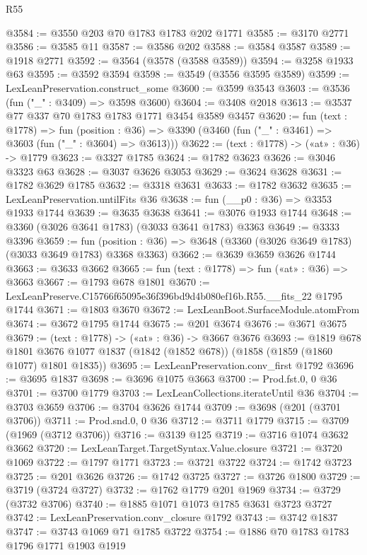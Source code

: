 \begin{lexlean}{R55}
\begin{coremodule}
@3584 := @3550 @203 @70 @1783 @1783 @202 @1771
@3585 := @3170 @2771
@3586 := @3585 @11
@3587 := @3586 @202
@3588 := @3584 @3587
@3589 := @1918 @2771
@3592 := @3564 (@3578 (@3588 @3589))
@3594 := @3258 @1933 @63
@3595 := @3592 @3594
@3598 := @3549 (@3556 @3595 @3589)
@3599 := LexLeanPreservation.construct_some
@3600 := @3599 @3543
@3603 := @3536 (fun ("_" : @3409) => @3598 @3600)
@3604 := @3408 @2018
@3613 := @3537 @77 @337 @70 @1783 @1783 @1771 @3454 @3589 @3457
@3620 := fun (text : @1778) =>
  fun (position : @36) => @3390 (@3460 (fun ("_" : @3461) => @3603 (fun ("_" : @3604) => @3613)))
@3622 := (text : @1778) -> («at» : @36) -> @1779
@3623 := @3327 @1785
@3624 := @1782 @3623
@3626 := @3046 @3323 @63
@3628 := @3037 @3626 @3053
@3629 := @3624 @3628
@3631 := @1782 @3629 @1785
@3632 := @3318 @3631
@3633 := @1782 @3632
@3635 := LexLeanPreservation.untilFits @36
@3638 := fun (__p0 : @36) => @3353 @1933 @1744
@3639 := @3635 @3638
@3641 := @3076 @1933 @1744
@3648 := @3360 (@3026 @3641 @1783) (@3033 @3641 @1783) @3363
@3649 := @3333 @3396
@3659 := fun (position : @36) => @3648 (@3360 (@3026 @3649 @1783) (@3033 @3649 @1783) @3368 @3363)
@3662 := @3639 @3659 @3626 @1744
@3663 := @3633 @3662
@3665 := fun (text : @1778) => fun («at» : @36) => @3663
@3667 := @1793 @678 @1801
@3670 := LexLeanPreserve.C15766f65095e36f396bd9d4b080ef16b.R55.__fits_22 @1795 @1744
@3671 := @1803 @3670
@3672 := LexLeanBoot.SurfaceModule.atomFrom
@3674 := @3672 @1795 @1744
@3675 := @201 @3674
@3676 := @3671 @3675
@3679 := (text : @1778) -> («at» : @36) -> @3667 @3676
@3693 := @1819
    @678
    @1801
    @3676
    @1077
    @1837
    (@1842 (@1852 @678))
    (@1858 (@1859 (@1860 @1077) @1801 @1835))
@3695 := LexLeanPreservation.conv_first @1792
@3696 := @3695 @1837
@3698 := @3696 @1075 @3663
@3700 := Prod.fst.{0, 0} @36
@3701 := @3700 @1779
@3703 := LexLeanCollections.iterateUntil @36
@3704 := @3703 @3659
@3706 := @3704 @3626 @1744
@3709 := @3698 (@201 (@3701 @3706))
@3711 := Prod.snd.{0, 0} @36
@3712 := @3711 @1779
@3715 := @3709 (@1969 (@3712 @3706))
@3716 := @3139 @125
@3719 := @3716 @1074 @3632 @3662
@3720 := LexLeanTarget.TargetSyntax.Value.closure
@3721 := @3720 @1069
@3722 := @1797 @1771
@3723 := @3721 @3722
@3724 := @1742 @3723
@3725 := @201 @3626
@3726 := @1742 @3725
@3727 := @3726 @1800
@3729 := @3719 (@3724 @3727)
@3732 := @1762 @1779 @201 @1969
@3734 := @3729 (@3732 @3706)
@3740 := @1885 @1071 @1073 @1785 @3631 @3723 @3727
@3742 := LexLeanPreservation.conv_closure @1792
@3743 := @3742 @1837
@3747 := @3743 @1069 @71 @1785 @3722
@3754 := @1886 @70 @1783 @1783 @1796 @1771 @1903 @1919

\end{coremodule}
\end{lexlean}
